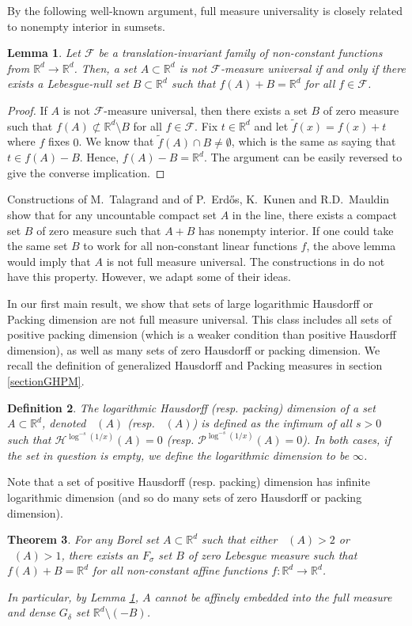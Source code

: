 \documentclass[12pt]{amsart}
\DeclareMathOperator{\hlogdim}{dim^{\log}_H}
\DeclareMathOperator{\plogdim}{dim^{\log}_P}
\newtheorem{theorem}{Theorem}
\newtheorem{definition}[theorem]{Definition}
\newtheorem{lemma}[theorem]{Lemma}
\def\R{{\mathbb{R}}}
\numberwithin{theorem}{section}
\numberwithin{equation}{section}
\begin{document}
By the following well-known argument, full measure universality is closely related to nonempty interior in sumsets.
\begin{lemma} \label{lem:universality-sumset}
Let $\mathcal{F}$ be a translation-invariant family of non-constant functions from $\R^d\to\R^d$. Then, a set $A\subset\R^d$ is not $\mathcal{F}$-measure universal if and only if there exists a Lebesgue-null set $B\subset\R^d$ such that $f(A)+B=\R^d$ for all $f\in\mathcal{F}$.
\end{lemma}
\begin{proof}
        If $A$ is not $\mathcal{F}$-measure universal, then there exists a set $B$ of zero measure such that $f(A)\not\subset \R^d\setminus B$ for all $f\in\mathcal{F}$. Fix $t\in\R^d$ and let $\tilde{f}(x)=f(x)+t$ where $f$ fixes $0$. We know that $\tilde{f}(A)\cap B\neq \emptyset$, which is the same as saying that $t\in f(A)-B$. Hence, $f(A)-B=\R^d$. The argument can be easily reversed to give the converse implication.
\end{proof}

Constructions of M.~Talagrand \cite{Talagrand76} and of P.~Erd\H{o}s, K.~Kunen and R.D.~Mauldin \cite{EKM81} show that for any uncountable compact set $A$ in the line, there exists a compact set $B$ of zero measure such that $A+B$ has nonempty interior. If one could take the same set $B$ to work for all non-constant linear functions $f$, the above lemma would imply that $A$ is not full measure universal. The constructions in \cite{Talagrand76, EKM81} do not have this property. However, we adapt some of their ideas.

In our first main result, we show that sets of large logarithmic Hausdorff or Packing dimension are not full measure universal. This class includes all sets of positive packing dimension (which is a weaker condition than positive Hausdorff dimension), as well as many sets of zero Hausdorff or packing dimension. We recall the definition of generalized Hausdorff and Packing measures in section \ref{sectionGHPM}.
\begin{definition}
    The \emph{logarithmic Hausdorff (resp. packing) dimension}  of a set $A\subset\R^d$, denoted  $\hlogdim(A)$ (resp. $\plogdim(A)$) is defined as the infimum of all $s>0$ such that $\mathcal{H}^{\log^{-s}(1/x)}(A)=0$ (resp. $\mathcal{P}^{\log^{-s}(1/x)}(A)=0$). In both cases, if the set in question is empty, we define the logarithmic dimension to be $\infty$.
\end{definition}
Note that a set of positive Hausdorff (resp. packing) dimension has infinite logarithmic dimension (and so do many sets of zero Hausdorff or packing dimension).
\begin{theorem} \label{thm:full-sumset-Erdos}
    For any Borel set $A\subset\R^d$ such that either $\plogdim(A)>2$ or $\hlogdim(A)>1$,  there exists an $F_\sigma$ set $B$ of zero Lebesgue measure such that $f(A)+B=\R^d$ for all non-constant affine functions $f:\R^d\to\R^d$.

    In particular, by Lemma \ref{lem:universality-sumset}, $A$ cannot be affinely embedded into the full measure and dense $G_\delta$ set $\R^d\setminus (-B)$.
\end{theorem}
\end{document}
